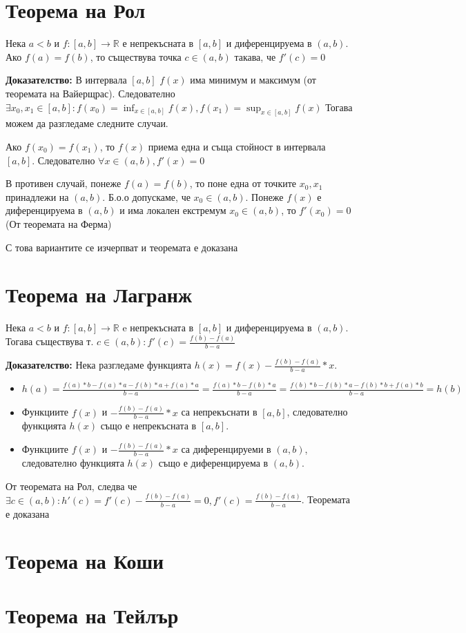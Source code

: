 \documentclass[fleqn,12pt]{article}
\begin{document}
\begin{flushleft}
\section{Теорема на Рол}
Нека $a<b$ и $f:[a,b]\rightarrow\mathbb{R}$ е непрекъсната в $[a,b]$ и диференцируема в $(a,b)$. Ако $f(a) = f(b)$, то съществува точка $c \in (a,b)$ такава, че $f'(c)=0$

\textbf{Доказателство:}
В интервала $[a,b]$ $f(x)$ има минимум и максимум (от теоремата на Вайерщрас).
Следователно $\exists x_0,x_1 \in [a,b]: f(x_0)=\inf_{x \in [a,b]} f(x), f(x_1)=\sup_{x \in [a,b]} f(x)$
Тогава можем да разгледаме следните случаи.

Ако $f(x_0) = f(x_1)$, то $f(x)$ приема една и съща стойност в интервала $[a,b]$. Следователно $\forall x \in (a,b), f'(x)=0$ 

В противен случай, понеже $f(a) = f(b)$, то поне една от точките $x_0,x_1$ принадлежи на $(a,b)$. Б.о.о допускаме, че $x_0 \in (a,b)$.
Понеже $f(x)$ е диференцируема в $(a,b)$ и има локален екстремум $x_0 \in (a,b)$, то $f'(x_0) = 0$ (От теоремата на Ферма) 

С това вариантите се изчерпват и теоремата е доказана

\section{Теорема на Лагранж}
Нека $a<b$ и $f:[a,b]\rightarrow\mathbb{R}$ e непрекъсната в $[a,b]$ и диференцируема в $(a,b)$.
Тогава съществува т. $c \in (a,b): f'(c) = \frac{f(b)-f(a)}{b-a}$

\textbf{Доказателство:}
Нека разгледаме функцията $h(x)=f(x) - \frac{f(b)-f(a)}{b-a}*x$. 
\begin{itemize}
    \item $h(a)=\frac{f(a)*b - f(a)*a - f(b)*a + f(a)*a}{b-a} = \frac{f(a)*b-f(b)*a}{b-a} = \frac{f(b)*b - f(b)*a - f(b)*b + f(a)*b}{b-a} = h(b)$
    \item Функциите $f(x)$ и $-\frac{f(b)-f(a)}{b-a}*x$ са непрекъснати в $[a,b]$, следователно функцията $h(x)$ също е непрекъсната в $[a,b]$.
    \item Функциите $f(x)$ и $-\frac{f(b)-f(a)}{b-a}*x$ са диференцируеми в $(a,b)$, следователно функцията $h(x)$ също е диференцируема в $(a,b)$.
\end{itemize}
От теоремата на Рол, следва че $\exists c \in (a,b): h'(c) = f'(c) - \frac{f(b)-f(a)}{b-a} = 0, f'(c) = \frac{f(b)-f(a)}{b-a}$.
Теоремата е доказана

\section{Теорема на Коши}

\section{Теорема на Тейлър}

\end{flushleft}
\end{document}
